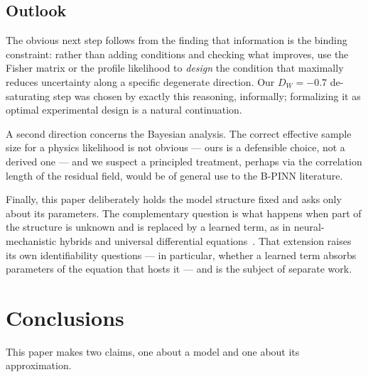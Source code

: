 \documentclass[11pt]{article}
\begin{document}
\subsection{Outlook}

The obvious next step follows from the finding that information is the binding
constraint: rather than adding conditions and checking what improves, use the
Fisher matrix or the profile likelihood to \emph{design} the condition that
maximally reduces uncertainty along a specific degenerate direction. Our
$D_W = -0.7$ de-saturating step was chosen by exactly this reasoning, informally;
formalizing it as optimal experimental design is a natural continuation.

A second direction concerns the Bayesian analysis. The correct effective sample
size for a physics likelihood is not obvious --- ours is a defensible choice,
not a derived one --- and we suspect a principled treatment, perhaps via the
correlation length of the residual field, would be of general use to the B-PINN
literature.

Finally, this paper deliberately holds the model structure fixed and asks only
about its parameters. The complementary question is what happens when part of
the structure is unknown and is replaced by a learned term, as in
neural-mechanistic hybrids and universal differential
equations~\citep{faure2023hybrid,velioglu2025pinn,liu2022hybrid}. That
extension raises its own identifiability questions --- in particular, whether a
learned term absorbs parameters of the equation that hosts it --- and is the
subject of separate work.

\section{Conclusions}
\label{sec:conclusion}

This paper makes two claims, one about a model and one about its approximation.
\end{document}
